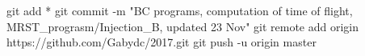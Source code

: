 git add *
git commit -m "BC programs, computation of time of flight, MRST_prograsm/Injection_B, updated 23 Nov"
git remote add origin https://github.com/Gabydc/2017.git
git push -u origin master

